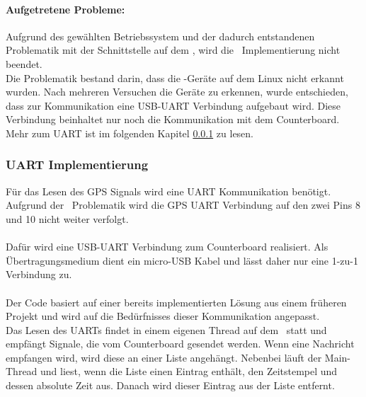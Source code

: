 \paragraph{Aufgetretene Probleme:}
Aufgrund des gewählten Betriebssystem und der dadurch entstandenen Problematik mit der Schnittstelle auf dem \rpi, wird die \iic\ Implementierung nicht beendet.\\
Die Problematik bestand darin, dass die \iic-Geräte auf dem Linux nicht erkannt wurden. Nach mehreren Versuchen die Geräte zu erkennen, wurde entschieden, dass zur Kommunikation eine USB-UART Verbindung aufgebaut wird. Diese Verbindung beinhaltet nur noch die Kommunikation mit dem Counterboard. Mehr zum UART ist im folgenden Kapitel \ref{sec:uart} zu lesen.

\clearpage
\subsubsection{UART Implementierung}\label{sec:uart}%
Für das Lesen des GPS Signals wird eine UART Kommunikation benötigt.
Aufgrund der \iic\ Problematik wird die GPS UART Verbindung auf den zwei Pins 8 und 10 nicht weiter verfolgt.\\
\\
Dafür wird eine USB-UART Verbindung zum Counterboard realisiert. Als Übertragungsmedium dient ein micro-USB Kabel und lässt daher nur eine 1-zu-1 Verbindung zu.\\
\\
Der Code basiert auf einer bereits implementierten Lösung aus einem früheren Projekt und wird auf die Bedürfnisses dieser Kommunikation angepasst.\\
Das Lesen des UARTs findet in einem eigenen Thread auf dem \rpi\ statt und empfängt Signale, die vom Counterboard gesendet werden. Wenn eine Nachricht empfangen wird, wird diese an einer Liste angehängt. Nebenbei läuft der Main-Thread und liest, wenn die Liste einen Eintrag enthält, den Zeitstempel und dessen absolute Zeit aus. Danach wird dieser Eintrag aus der Liste entfernt.